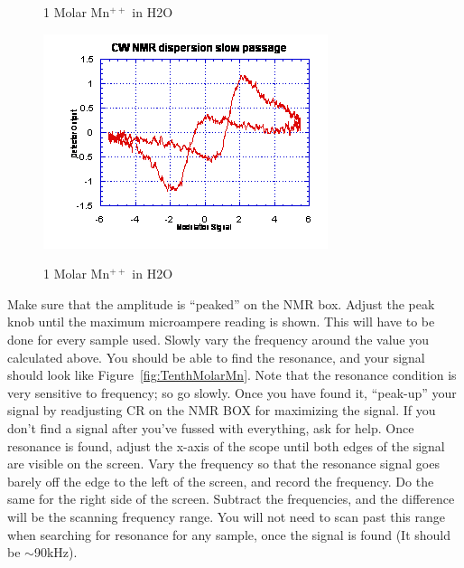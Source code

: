 \documentclass{../lab}
\begin{document}
\begin{enumerate}
\begin{figure}[h]
\begin{minipage}[t]{0.31\textwidth}
        \caption{1 Molar Mn$^{++}$ in H2O}
    \end{minipage}\hfill
    \begin{minipage}[t]{0.31\textwidth}
        \href{http://experimentationlab.berkeley.edu/sites/default/files/images/NMR23.gif}{\includegraphics[width=\linewidth,keepaspectratio]{images/NMR23.png}}
        \caption{1 Molar Mn$^{++}$ in H2O}
    \end{minipage}
    \end{figure}

    Make sure that the amplitude is ``peaked'' on the NMR box. Adjust the peak knob until the maximum microampere reading is shown. This will have to be done for every sample used. Slowly vary the frequency around the value you calculated above. You should be able to find the resonance, and your signal should look like Figure~\ref{fig:TenthMolarMn}. Note that the resonance condition is very sensitive to frequency; so go slowly. Once you have found it, ``peak-up'' your signal by readjusting CR on the NMR BOX for maximizing the signal. If you don't find a signal after you've fussed with everything, ask for help. Once resonance is found, adjust the x-axis of the scope until both edges of the signal are visible on the screen. Vary the frequency so that the resonance signal goes barely off the edge to the left of the screen, and record the frequency. Do the same for the right side of the screen. Subtract the frequencies, and the difference will be the scanning frequency range. You will not need to scan past this range when searching for resonance for any sample, once the signal is found (It should be $\sim$90kHz).
    

\end{enumerate}
\end{document}
